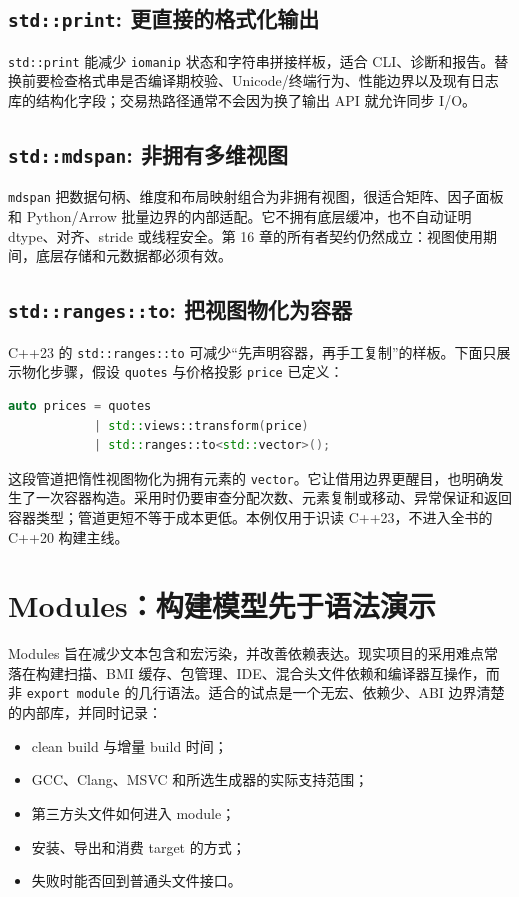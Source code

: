 \subsection{\texttt{std::print}: 更直接的格式化输出}

\texttt{std::print} 能减少 \texttt{iomanip} 状态和字符串拼接样板，适合 CLI、诊断和报告。替换前要检查格式串是否编译期校验、Unicode/终端行为、性能边界以及现有日志库的结构化字段；交易热路径通常不会因为换了输出 API 就允许同步 I/O。

\subsection{\texttt{std::mdspan}: 非拥有多维视图}

\texttt{mdspan} 把数据句柄、维度和布局映射组合为非拥有视图，很适合矩阵、因子面板和 Python/Arrow 批量边界的内部适配。它不拥有底层缓冲，也不自动证明 dtype、对齐、stride 或线程安全。第 16 章的所有者契约仍然成立：视图使用期间，底层存储和元数据都必须有效。

\subsection{\texttt{std::ranges::to}: 把视图物化为容器}

C++23 的 \texttt{std::ranges::to} 可减少“先声明容器，再手工复制”的样板。下面只展示物化步骤，假设 \texttt{quotes} 与价格投影 \texttt{price} 已定义：

\begin{lstlisting}[language=C++]
auto prices = quotes
            | std::views::transform(price)
            | std::ranges::to<std::vector>();
\end{lstlisting}

这段管道把惰性视图物化为拥有元素的 \texttt{vector}。它让借用边界更醒目，也明确发生了一次容器构造。采用时仍要审查分配次数、元素复制或移动、异常保证和返回容器类型；管道更短不等于成本更低。本例仅用于识读 C++23，不进入全书的 C++20 构建主线。

\section{Modules：构建模型先于语法演示}

Modules 旨在减少文本包含和宏污染，并改善依赖表达。现实项目的采用难点常落在构建扫描、BMI 缓存、包管理、IDE、混合头文件依赖和编译器互操作，而非 \texttt{export module} 的几行语法。适合的试点是一个无宏、依赖少、ABI 边界清楚的内部库，并同时记录：

\begin{itemize}
  \item clean build 与增量 build 时间；
  \item GCC、Clang、MSVC 和所选生成器的实际支持范围；
  \item 第三方头文件如何进入 module；
  \item 安装、导出和消费 target 的方式；
  \item 失败时能否回到普通头文件接口。
\end{itemize}

